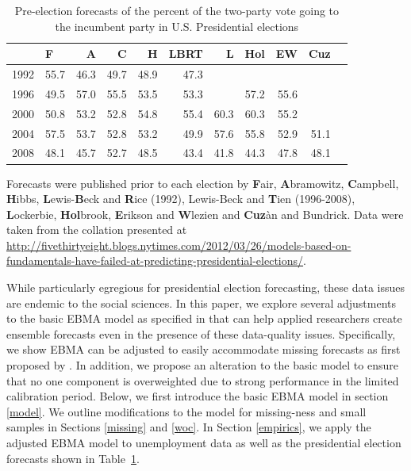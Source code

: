 \documentclass[12pt,fullpage,endnotes]{article}
\begin{document}
\begin{table}[ht]
\caption{Pre-election forecasts of the percent of the two-party vote going to the incumbent party in U.S. Presidential elections}
\label{tab:one}
\footnotesize
\begin{center}
\begin{tabular}{rlrrrrrrrrr}
  \toprule
  & F & A & C & H & LBRT & L & Hol & EW & Cuz \\ 
  \midrule
  1992 & 55.7 & 46.3 & 49.7 & 48.9 & 47.3 &  &  &  &  \\ 
  1996 & 49.5 & 57.0 & 55.5 & 53.5 & 53.3 &  & 57.2 & 55.6 &  \\ 
  2000 & 50.8 & 53.2 & 52.8 & 54.8 & 55.4 & 60.3 & 60.3 & 55.2 &  \\ 
  2004 & 57.5 & 53.7 & 52.8 & 53.2 & 49.9 & 57.6 & 55.8 & 52.9 & 51.1 \\ 
  2008 & 48.1 & 45.7 & 52.7 & 48.5 & 43.4 & 41.8 & 44.3 & 47.8 & 48.1 \\ 
  \bottomrule

\end{tabular}
\end{center}
Forecasts were published prior to each election by \textbf{F}air, \textbf{A}bramowitz, \textbf{C}ampbell, \textbf{H}ibbs, \textbf{L}ewis-\textbf{B}eck and \textbf{R}ice (1992), Lewis-Beck and \textbf{T}ien  (1996-2008),   \textbf{L}ockerbie, \textbf{Hol}brook, \textbf{E}rikson and \textbf{W}lezien and \textbf{Cuz}\`an and Bundrick.  Data were taken from the collation presented at \url{http://fivethirtyeight.blogs.nytimes.com/2012/03/26/models-based-on-fundamentals-have-failed-at-predicting-presidential-elections/}.
\end{table}

While particularly egregious for presidential election forecasting,
these data issues are endemic to the social sciences.  In this paper,
we explore several adjustments to the basic EBMA model as specified in
\citet{mhw:2012} that can help applied researchers create ensemble
forecasts even in the presence of these data-quality issues.
Specifically, we show EBMA can be adjusted to easily accommodate
missing forecasts as first proposed by \citep{Fraley:2010}.  In
addition, we propose an alteration to the basic model to ensure that
no one component is overweighted due to strong performance in the
limited calibration period.  Below, we first introduce the basic EBMA
model in section \ref{model}.  We outline modifications to the model
for missing-ness and small samples in Sections \ref{missing} and
\ref{woc}. In Section \ref{empirics}, we apply the adjusted EBMA model
to unemployment data as well as the presidential election forecasts
shown in Table~\ref{tab:one}.
\end{document}
